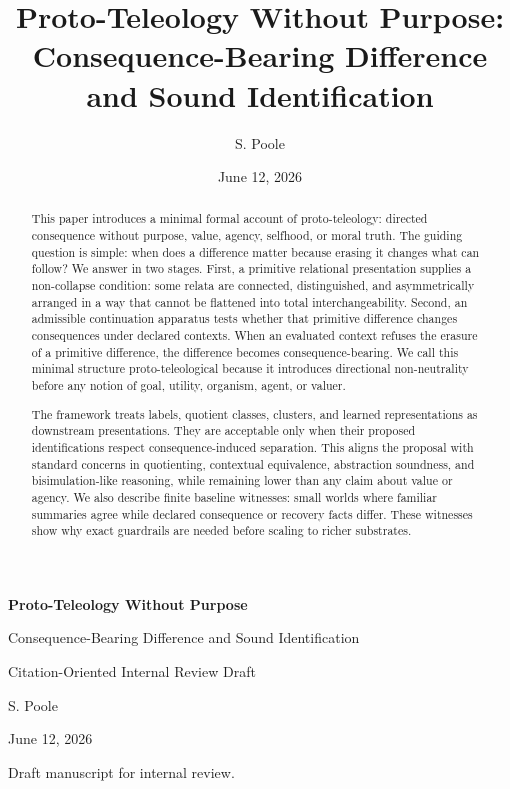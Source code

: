 \documentclass[11pt]{article}
\title{Proto-Teleology Without Purpose:\\
Consequence-Bearing Difference and Sound Identification}
\author{S. Poole}
\date{June 12, 2026}
\begin{document}
\begin{titlepage}
\centering
\vspace*{1.2in}
{\Huge\bfseries Proto-Teleology Without Purpose\par}
\vspace{0.35in}
{\LARGE Consequence-Bearing Difference and Sound Identification\par}
\vspace{0.85in}
{\Large Citation-Oriented Internal Review Draft\par}
\vfill
{\large S. Poole\par}
\vspace{0.2in}
{\large June 12, 2026\par}
\vspace{0.7in}
{\small Draft manuscript for internal review.\par}
\end{titlepage}

\begin{abstract}
This paper introduces a minimal formal account of proto-teleology: directed
consequence without purpose, value, agency, selfhood, or moral truth. The
guiding question is simple: when does a difference matter because erasing it
changes what can follow? We answer in two stages. First, a primitive relational
presentation supplies a non-collapse condition: some relata are connected,
distinguished, and asymmetrically arranged in a way that cannot be flattened
into total interchangeability. Second, an admissible continuation apparatus
tests whether that primitive difference changes consequences under declared
contexts. When an evaluated context refuses the erasure of a primitive
difference, the difference becomes consequence-bearing. We call this minimal
structure proto-teleological because it introduces directional non-neutrality
before any notion of goal, utility, organism, agent, or valuer.

The framework treats labels, quotient classes, clusters, and learned
representations as downstream presentations. They are acceptable only when
their proposed identifications respect consequence-induced separation. This
aligns the proposal with standard concerns in quotienting, contextual
equivalence, abstraction soundness, and bisimulation-like reasoning, while
remaining lower than any claim about value or agency. We also describe finite
baseline witnesses: small worlds where familiar summaries agree while declared
consequence or recovery facts differ. These witnesses show why exact guardrails
are needed before scaling to richer substrates.
\end{abstract}
\end{document}
